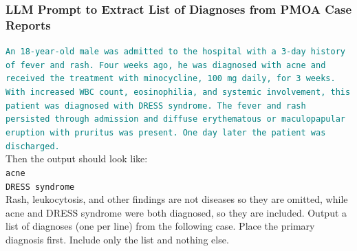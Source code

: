 \subsubsection{LLM Prompt to Extract List of Diagnoses from PMOA Case Reports}
\label{ch05:apd:diagnosis-prompt}
\begin{tcolorbox}[
  colback=gray!5,
  colframe=gray!100,
  title=LLM prompt to extract list of diagnoses from PMOA case reports,
  boxrule=2pt,
  enhanced,
  breakable,                %
  before skip=8pt,          %
  after skip=8pt,           %
  pad at break*=2mm,        %
  fontupper=\scriptsize,
  title after break={Prompt} %
]
\textcolor{teal}{\texttt{An 18-year-old male was admitted to the hospital with a 3-day history of fever and rash. Four weeks ago, he was diagnosed with acne and received the treatment with minocycline, 100 mg daily, for 3 weeks. With increased WBC count, eosinophilia, and systemic involvement, this patient was diagnosed with DRESS syndrome. The fever and rash persisted through admission and diffuse erythematous or maculopapular eruption with pruritus was present. One day later the patient was discharged.}} \\

Then the output should look like:\\
    \texttt{acne} \\
    \texttt{DRESS syndrome} \\

Rash, leukocytosis, and other findings are not diseases so they are omitted, while acne and DRESS syndrome were both diagnosed, so they are included. Output a list of diagnoses (one per line) from the following case. Place the primary diagnosis first. Include only the list and nothing else.

\end{tcolorbox}

